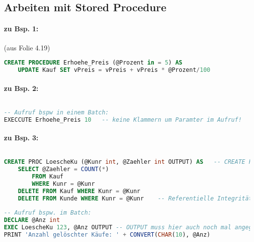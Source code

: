 \subsection{Arbeiten mit Stored Procedure}
\paragraph{zu Bsp. 1:} (aus Folie 4.19)
\begin{lstlisting}[language=SQL]
CREATE PROCEDURE Erhoehe_Preis (@Prozent in = 5) AS
	UPDATE Kauf SET vPreis = vPreis + vPreis * @Prozent/100
\end{lstlisting}
\paragraph{zu Bsp. 2:} $ $
\begin{lstlisting}[language=SQL]
-- Aufruf bspw in einem Batch:
EXECCUTE Erhoehe_Preis 10	-- keine Klammern um Paramter im Aufruf!
\end{lstlisting}
\paragraph{zu Bsp. 3:} $ $
\begin{lstlisting}[language=SQL]
CREATE PROC LoescheKu (@Kunr int, @Zaehler int OUTPUT) AS	-- CREATE PROC: Abkürzung für CREATE PROCEDURE
	SELECT @Zaehler = COUNT(*)
		FROM Kauf
		WHERE Kunr = @Kunr
	DELETE FROM Kauf WHERE Kunr = @Kunr
	DELETE FROM Kunde WHERE Kunr = @Kunr	-- Referentielle Integrität: Erst Kauf, dann Kunde löschen!
	
-- Aufruf bspw. im Batch:
DECLARE @Anz int
EXEC LoescheKu 123, @Anz OUTPUT -- OUTPUT muss hier auch noch mal angegeben werden!
PRINT 'Anzahl gelöschter Käufe: ' + CONVERT(CHAR(10), @Anz)
\end{lstlisting}

